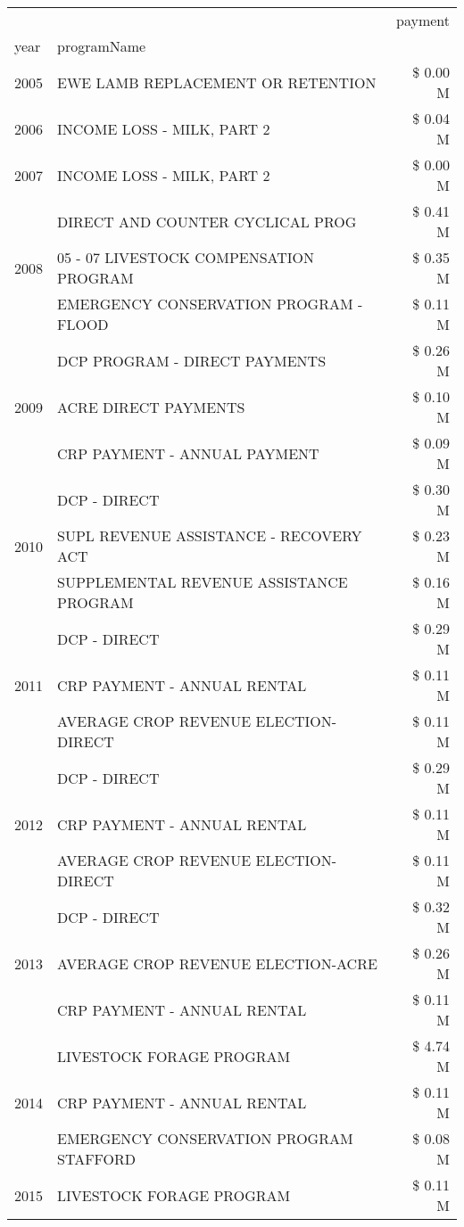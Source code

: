 \begin{tabular}{llr}
\toprule
 &  & payment \\
year & programName &  \\
\midrule
2005 & EWE LAMB REPLACEMENT OR RETENTION & \$ 0.00 M \\
\cline{1-3}
2006 & INCOME LOSS - MILK, PART 2 & \$ 0.04 M \\
\cline{1-3}
2007 & INCOME LOSS - MILK, PART 2 & \$ 0.00 M \\
\cline{1-3}
\multirow[t]{3}{*}{2008} & DIRECT AND COUNTER CYCLICAL PROG & \$ 0.41 M \\
 & 05 - 07 LIVESTOCK COMPENSATION PROGRAM & \$ 0.35 M \\
 & EMERGENCY CONSERVATION PROGRAM - FLOOD & \$ 0.11 M \\
\cline{1-3}
\multirow[t]{3}{*}{2009} & DCP PROGRAM - DIRECT PAYMENTS & \$ 0.26 M \\
 & ACRE DIRECT PAYMENTS & \$ 0.10 M \\
 & CRP PAYMENT - ANNUAL PAYMENT & \$ 0.09 M \\
\cline{1-3}
\multirow[t]{3}{*}{2010} & DCP - DIRECT & \$ 0.30 M \\
 & SUPL REVENUE ASSISTANCE - RECOVERY ACT & \$ 0.23 M \\
 & SUPPLEMENTAL REVENUE ASSISTANCE PROGRAM & \$ 0.16 M \\
\cline{1-3}
\multirow[t]{3}{*}{2011} & DCP - DIRECT & \$ 0.29 M \\
 & CRP PAYMENT - ANNUAL RENTAL & \$ 0.11 M \\
 & AVERAGE CROP REVENUE ELECTION-DIRECT & \$ 0.11 M \\
\cline{1-3}
\multirow[t]{3}{*}{2012} & DCP - DIRECT & \$ 0.29 M \\
 & CRP PAYMENT - ANNUAL RENTAL & \$ 0.11 M \\
 & AVERAGE CROP REVENUE ELECTION-DIRECT & \$ 0.11 M \\
\cline{1-3}
\multirow[t]{3}{*}{2013} & DCP - DIRECT & \$ 0.32 M \\
 & AVERAGE CROP REVENUE ELECTION-ACRE & \$ 0.26 M \\
 & CRP PAYMENT - ANNUAL RENTAL & \$ 0.11 M \\
\cline{1-3}
\multirow[t]{3}{*}{2014} & LIVESTOCK FORAGE PROGRAM & \$ 4.74 M \\
 & CRP PAYMENT - ANNUAL RENTAL & \$ 0.11 M \\
 & EMERGENCY CONSERVATION PROGRAM STAFFORD & \$ 0.08 M \\
\cline{1-3}
\multirow[t]{3}{*}{2015} & LIVESTOCK FORAGE PROGRAM & \$ 0.11 M \\

\end{tabular}
